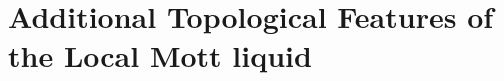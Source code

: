 \documentclass[reprint,prb,superscriptaddress]{revtex4-2}
\begin{document}





\section{Additional Topological Features of the Local Mott liquid}
\end{document}
